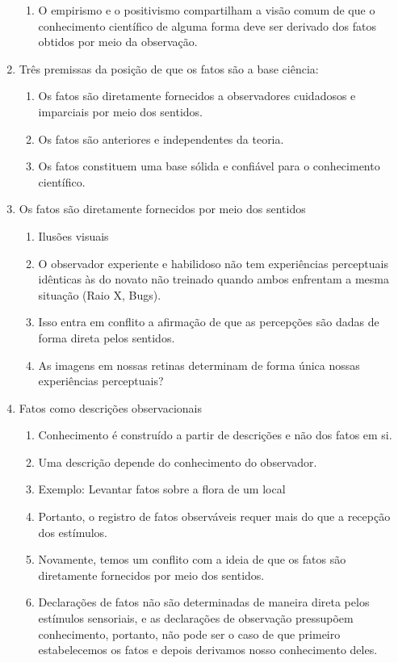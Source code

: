\documentclass{article}
\begin{document}
\begin{enumerate}
\begin{enumerate}
        \item O empirismo e o positivismo compartilham a visão comum de que o conhecimento científico de alguma forma deve ser derivado dos fatos obtidos por meio da observação.
    \end{enumerate}
    \item Três premissas da posição de que os fatos são a base ciência:
    \begin{enumerate}
        \item Os fatos são diretamente fornecidos a observadores cuidadosos e imparciais por meio dos sentidos.
        \item Os fatos são anteriores e independentes da teoria.
        \item Os fatos constituem uma base sólida e confiável para o conhecimento científico.
    \end{enumerate}
    \item Os fatos são diretamente fornecidos por meio dos sentidos
    \begin{enumerate}
        \item Ilusões visuais
        \item O observador experiente e habilidoso não tem experiências perceptuais idênticas às do novato não treinado quando ambos enfrentam a mesma situação (Raio X, Bugs).
        \item Isso entra em conflito a afirmação de que as percepções são dadas de forma direta pelos sentidos.
        \item As imagens em nossas retinas determinam de forma única nossas experiências perceptuais?
    \end{enumerate}
    \item Fatos como descrições observacionais
    \begin{enumerate}
        \item Conhecimento é construído a partir de descrições e não dos fatos em si.
        \item Uma descrição depende do conhecimento do observador.
        \item Exemplo: Levantar fatos sobre a flora de um local
        \item Portanto, o registro de fatos observáveis requer mais do que a recepção dos estímulos.
        \item Novamente, temos um conflito com a ideia de que os fatos são diretamente fornecidos por meio dos sentidos.
        \item Declarações de fatos não são determinadas de maneira direta pelos estímulos sensoriais, e as declarações de observação pressupõem conhecimento, portanto, não pode ser o caso de que primeiro estabelecemos os fatos e depois derivamos nosso conhecimento deles.

\end{enumerate}
\end{enumerate}
\end{document}
